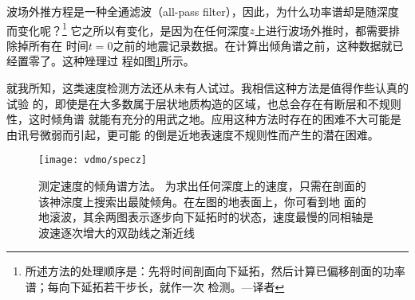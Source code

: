 波场外推方程是一种全通滤波（all-pass filter），因此，为什么功率谱却是随深度而变化呢？\footnote{
所述方法的处理顺序是：先将时间剖面向下延拓，然后计算已偏移剖面的功率谱；每向下延拓若干步长，就作一次
检测。---译者}
它之所以有变化，是因为在任何深度$z$上进行波场外推时，都需要排除掉所有在
时间$t=0$之前的地震记录数据。在计算出倾角谱之前，这种数据就已经置零了。这种矬理过
程如图\ref{fig:vdmo/specz}所示。

就我所知，这类速度检测方法还从未有人试过。我相信这种方法是值得作些认真的试验
的，即使是在大多数属于层状地质构造的区域，也总会存在有断层和不规则性，这时倾角谱
就能有充分的用武之地。应用这种方法时存在的困难不大可能是由讯号微弱而引起，更可能
的倒是近地表速度不规则性而产生的潜在困难。

\begin{figure}[H]
\centering
\texttt{[image: vdmo/specz]}
\caption[specz]{测定速度的倾角谱方法。
为求出任何深度上的速度，只需在剖面的该神淙度上搜索出最陡倾角。在左图的地表面上，你可看到地
面的地滚波，其余两图表示逐步向下延拓时的状态，速度最慢的同相轴是波速逐次增大的双劭线之渐近线}
\label{fig:vdmo/specz}
\end{figure}
